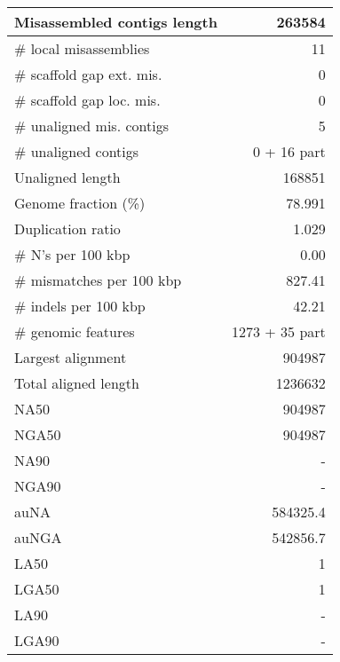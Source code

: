 \documentclass[12pt,a4paper]{article}
\begin{document}
\begin{table}[ht]
\begin{center}
\begin{tabular}{|l*{1}{|r}|}
Misassembled contigs length & 263584 \\ \hline
\# local misassemblies & 11 \\ \hline
\# scaffold gap ext. mis. & 0 \\ \hline
\# scaffold gap loc. mis. & 0 \\ \hline
\# unaligned mis. contigs & 5 \\ \hline
\# unaligned contigs & 0 + 16 part \\ \hline
Unaligned length & 168851 \\ \hline
Genome fraction (\%) & 78.991 \\ \hline
Duplication ratio & 1.029 \\ \hline
\# N's per 100 kbp & 0.00 \\ \hline
\# mismatches per 100 kbp & 827.41 \\ \hline
\# indels per 100 kbp & 42.21 \\ \hline
\# genomic features & 1273 + 35 part \\ \hline
Largest alignment & 904987 \\ \hline
Total aligned length & 1236632 \\ \hline
NA50 & 904987 \\ \hline
NGA50 & 904987 \\ \hline
NA90 & - \\ \hline
NGA90 & - \\ \hline
auNA & 584325.4 \\ \hline
auNGA & 542856.7 \\ \hline
LA50 & 1 \\ \hline
LGA50 & 1 \\ \hline
LA90 & - \\ \hline
LGA90 & - \\ \hline
\end{tabular}
\end{center}
\end{table}
\end{document}
